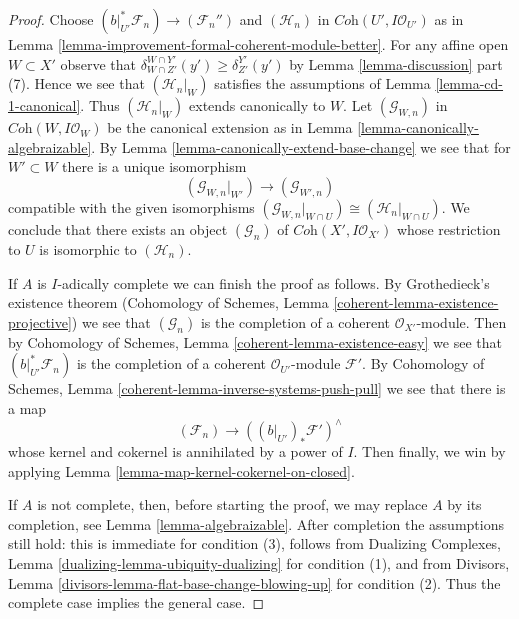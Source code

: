 \begin{proof}
\medskip\noindent
Choose $(b|_{U'}^*\mathcal{F}_n) \to (\mathcal{F}_n'')$
and $(\mathcal{H}_n)$ in $\textit{Coh}(U', I\mathcal{O}_{U'})$
as in Lemma \ref{lemma-improvement-formal-coherent-module-better}.
For any affine open $W \subset X'$ observe that
$\delta^{W \cap Y'}_{W \cap Z'}(y') \geq \delta^{Y'}_{Z'}(y')$ by
Lemma \ref{lemma-discussion} part (7). Hence we see that
$(\mathcal{H}_n|_W)$ satisfies the assumptions of
Lemma \ref{lemma-cd-1-canonical}.
Thus $(\mathcal{H}_n|_W)$ extends canonically to $W$.
Let $(\mathcal{G}_{W, n})$ in $\textit{Coh}(W, I\mathcal{O}_W)$
be the canonical extension as in
Lemma \ref{lemma-canonically-algebraizable}.
By Lemma \ref{lemma-canonically-extend-base-change}
we see that for $W' \subset W$ there is a unique isomorphism
$$
(\mathcal{G}_{W, n}|_{W'}) \longrightarrow
(\mathcal{G}_{W', n})
$$
compatible with the given isomorphisms
$(\mathcal{G}_{W, n}|_{W \cap U}) \cong (\mathcal{H}_n|_{W \cap U})$.
We conclude that there exists an object
$(\mathcal{G}_n)$ of $\textit{Coh}(X', I\mathcal{O}_{X'})$
whose restriction to $U$ is isomorphic to $(\mathcal{H}_n)$.

\medskip\noindent
If $A$ is $I$-adically complete we can finish the proof as follows.
By Grothedieck's existence theorem
(Cohomology of Schemes, Lemma \ref{coherent-lemma-existence-projective})
we see that $(\mathcal{G}_n)$ is the completion of a coherent
$\mathcal{O}_{X'}$-module. Then by
Cohomology of Schemes, Lemma \ref{coherent-lemma-existence-easy}
we see that $(b|_{U'}^*\mathcal{F}_n)$
is the completion of a coherent $\mathcal{O}_{U'}$-module
$\mathcal{F}'$.
By Cohomology of Schemes, Lemma \ref{coherent-lemma-inverse-systems-push-pull}
we see that there is a map
$$
(\mathcal{F}_n) \longrightarrow ((b|_{U'})_*\mathcal{F}')^\wedge
$$
whose kernel and cokernel is annihilated by a power of $I$.
Then finally, we win by applying
Lemma \ref{lemma-map-kernel-cokernel-on-closed}.

\medskip\noindent
If $A$ is not complete, then, before starting the proof, we may replace $A$
by its completion, see Lemma \ref{lemma-algebraizable}.
After completion the assumptions still hold: this is immediate
for condition (3), follows from
Dualizing Complexes, Lemma \ref{dualizing-lemma-ubiquity-dualizing}
for condition (1), and from
Divisors, Lemma \ref{divisors-lemma-flat-base-change-blowing-up}
for condition (2).
Thus the complete case implies the general case.
\end{proof}

